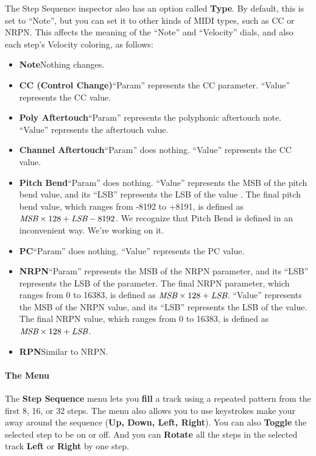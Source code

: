 \documentclass[twoside,10pt]{article}
\begin{document}
The Step Sequence inspector also has an option called {\bf Type}.  By default, this is set to ``Note'', but you can set it to other kinds of MIDI types, such as CC or NRPN.   This affects the meaning of the ``Note'' and ``Velocity'' dials, and also each step's Velocity coloring, as follows:

\begin{itemize}
\item {\bf Note}\qquad Nothing changes.
\item {\bf CC (Control Change)}\qquad ``Param'' represents the CC parameter.  ``Value'' represents the CC value.
\item {\bf Poly Aftertouch}\qquad ``Param'' represents the polyphonic aftertouch note.  ``Value'' represents the aftertouch value.
\item {\bf Channel Aftertouch}\qquad ``Param'' does nothing.  ``Value'' represents the CC value.
\item {\bf Pitch Bend}\qquad ``Param'' does nothing.  ``Value'' represents the MSB of the pitch bend value, and its ``LSB'' represents the LSB of the value .  The final pitch bend value, which ranges from -8192 to +8191, is defined as \(\text{\it MSB} \times 128 + \text{\it LSB} - 8192\). We recognize that Pitch Bend is defined in an inconvenient way.  We're working on it.
\item {\bf PC}\qquad ``Param'' does nothing.  ``Value'' represents the PC value.
\item {\bf NRPN}\qquad ``Param'' represents the MSB of the NRPN parameter, and its ``LSB'' represents the LSB of the parameter.   The final NRPN parameter, which ranges from 0 to 16383, is defined as \(\text{\it MSB} \times 128 + \text{\it LSB}\).  ``Value'' represents the MSB of the NRPN value, and its ``LSB'' represents the LSB of the value.  The final NRPN value, which ranges from 0 to 16383, is defined as \(\text{\it MSB} \times 128 + \text{\it LSB}\).  
\item {\bf RPN}\qquad Similar to NRPN.
\end{itemize}

\paragraph{The Menu}

The {\bf Step Sequence} menu lets you {\bf fill} a track using a repeated pattern from the first 8, 16, or 32 steps.  The menu also allows you to use keystrokes make your away around the sequence ({\bf Up, Down, Left, Right}).  You can also {\bf Toggle} the selected step to be on or off.  And you can {\bf Rotate} all the steps in the selected track {\bf Left} or {\bf Right} by one step.
\end{document}
